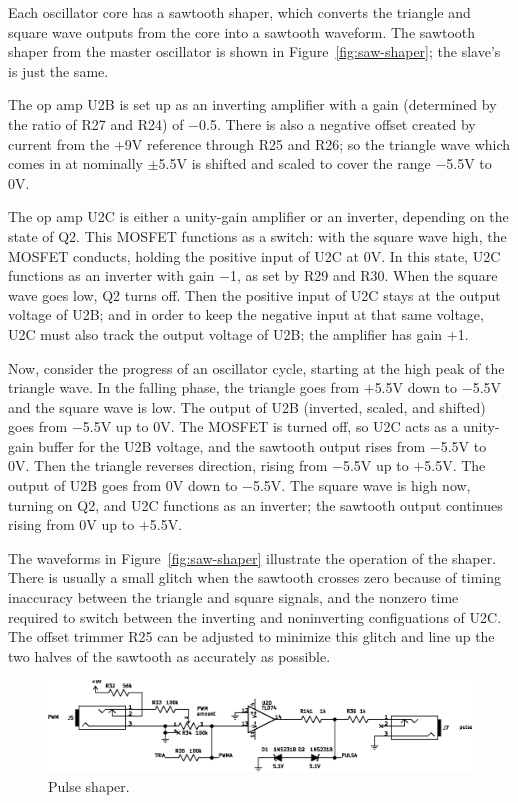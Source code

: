 Each oscillator core has a sawtooth shaper, which converts the triangle and
square wave outputs from the core into a sawtooth waveform.  The sawtooth
shaper from the master oscillator is shown in Figure~\ref{fig:saw-shaper};
the slave's is just the same.

The op amp U2B is set up as an inverting amplifier with a gain (determined
by the ratio of R27 and R24) of $-$0.5.  There is also a negative offset
created by current from the $+$9V reference through R25 and R26; so the
triangle wave which comes in at nominally $\pm$5.5V is shifted and scaled to
cover the range $-$5.5V to 0V.

The op amp U2C is either a unity-gain amplifier or an inverter, depending on
the state of Q2.  This MOSFET functions as a switch:  with the square wave
high, the MOSFET conducts, holding the positive input of U2C at 0V.  In this
state, U2C functions as an inverter with gain $-$1, as set by R29 and R30. 
When the square wave goes low, Q2 turns off.  Then the positive input of U2C
stays at the output voltage of U2B; and in order to keep the negative input
at that same voltage, U2C must also track the output voltage of U2B; the
amplifier has gain $+$1.

Now, consider the progress of an oscillator cycle, starting at the high peak
of the triangle wave.  In the falling phase, the triangle goes from $+$5.5V
down to $-$5.5V and the square wave is low.  The output of U2B (inverted,
scaled, and shifted) goes from $-$5.5V up to 0V.  The MOSFET is turned off,
so U2C acts as a unity-gain buffer for the U2B voltage, and the sawtooth
output rises from $-$5.5V to 0V.  Then the triangle reverses direction,
rising from $-$5.5V up to $+$5.5V.  The output of U2B goes from 0V down to
$-$5.5V.  The square wave is high now, turning on Q2, and U2C functions as
an inverter; the sawtooth output continues rising from 0V up to $+$5.5V. 

The waveforms in Figure~\ref{fig:saw-shaper} illustrate the operation of the
shaper.  There is usually a small glitch when the sawtooth crosses zero
because of timing inaccuracy between the triangle and square signals, and
the nonzero time required to switch between the inverting and noninverting
configuations of U2C.  The offset trimmer R25 can be adjusted to minimize
this glitch and line up the two halves of the sawtooth as accurately as
possible.

\begin{figure}
\centering\includegraphics{pulse-shaper}\par
\caption{Pulse shaper.}\label{fig:pulse-shaper}
\end{figure}

